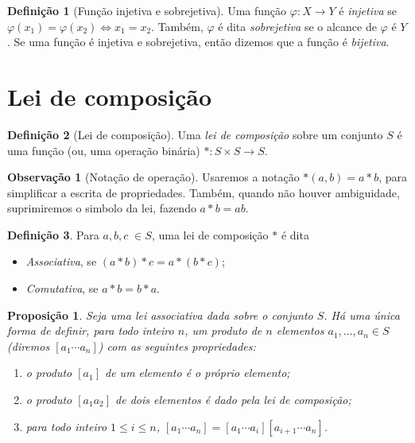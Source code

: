 \documentclass[a4paper,12pt]{report}
\theoremstyle{plain}
\newtheorem{proposicao}{Proposição}[section]
\theoremstyle{definition}
\newtheorem{definicao}{Definição}[section]
\newtheorem{observacao}{Observação}[section]
\begin{document}
\begin{definicao}[Função injetiva e sobrejetiva]
		Uma função $\varphi: X \longrightarrow Y$ é \emph{injetiva} se $\varphi(x_1) = \varphi(x_2) \iff x_1 = x_2$. Também, $\varphi$ é dita \emph{sobrejetiva} se o alcance de $\varphi$ é $Y$. Se uma função é injetiva e sobrejetiva, então dizemos que a função é \emph{bijetiva}.
\end{definicao}

\section{Lei de composição}

\begin{definicao}[Lei de composição]
	Uma \emph{lei de composição} sobre um conjunto \(S\) é uma função (ou, uma operação binária) \(*: S\times S \longrightarrow S\).
\end{definicao}

\begin{observacao}[Notação de operação]
	Usaremos a notação \(*(a,b) = a*b\), para simplificar a escrita de
	propriedades. Também, quando não houver ambiguidade, suprimiremos o simbolo da lei, fazendo $a*b = ab$.
\end{observacao}


\begin{definicao}
	Para $a,b,c \; \in S$, uma lei de composição $*$ é dita
	
	\begin{itemize}
		\item \emph{Associativa}, se $(a*b)*c = a*(b*c)$;
		\item \emph{Comutativa}, se \(a*b = b*a\).
	\end{itemize}
\end{definicao}

\begin{proposicao}
	Seja uma lei associativa dada sobre o conjunto
	\(S\). Há uma única forma de definir, para todo inteiro \(n\), um
	produto de \(n\) elementos \(a_1,\dots,a_n \in S\) (diremos
	\([a_1\dotsb a_n]\)) com as seguintes propriedades:
	
	\begin{enumerate}
		\def\labelenumi{\arabic{enumi}.}
		\item
		o produto \([a_1]\) de um elemento é o próprio elemento;
		\item
		o produto \([a_1a_2]\) de dois elementos é dado pela lei de
		composição;
		\item
		para todo inteiro \(1\leq i\leq n\),
		\([a_1\dotsb a_n] = [a_1\dotsb a_i][a_{i+1}\dotsb a_n]\).
	\end{enumerate}
\end{proposicao}
\end{document}
